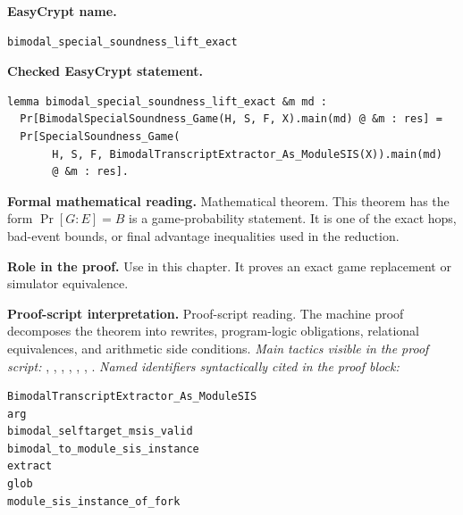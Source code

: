 \begin{formaltheorem}
\noindent\textbf{EasyCrypt name.}
\begin{lstlisting}[language=EasyCrypt,basicstyle=\ttfamily\scriptsize]
bimodal_special_soundness_lift_exact
\end{lstlisting}
\noindent\textbf{Checked EasyCrypt statement.}
\begin{lstlisting}[language=EasyCrypt,basicstyle=\ttfamily\scriptsize]
lemma bimodal_special_soundness_lift_exact &m md :
  Pr[BimodalSpecialSoundness_Game(H, S, F, X).main(md) @ &m : res] =
  Pr[SpecialSoundness_Game(
       H, S, F, BimodalTranscriptExtractor_As_ModuleSIS(X)).main(md)
       @ &m : res].
\end{lstlisting}
\noindent\textbf{Formal mathematical reading.}
Mathematical theorem. This theorem has the form \(\Pr[G:E] = B\) is a game-probability statement.  It is one of the exact hops, bad-event bounds, or final advantage inequalities used in the reduction.

\noindent\textbf{Role in the proof.}
Use in this chapter. It proves an exact game replacement or simulator equivalence.

\noindent\textbf{Proof-script interpretation.}
Proof-script reading. The machine proof decomposes the theorem into rewrites, program-logic obligations, relational equivalences, and arithmetic side conditions.
\emph{Main tactics visible in the proof script:} , , , , , , .
\emph{Named identifiers syntactically cited in the proof block:}
\begin{lstlisting}[language=EasyCrypt,basicstyle=\ttfamily\scriptsize]
BimodalTranscriptExtractor_As_ModuleSIS
arg
bimodal_selftarget_msis_valid
bimodal_to_module_sis_instance
extract
glob
module_sis_instance_of_fork
\end{lstlisting}

\end{formaltheorem}

